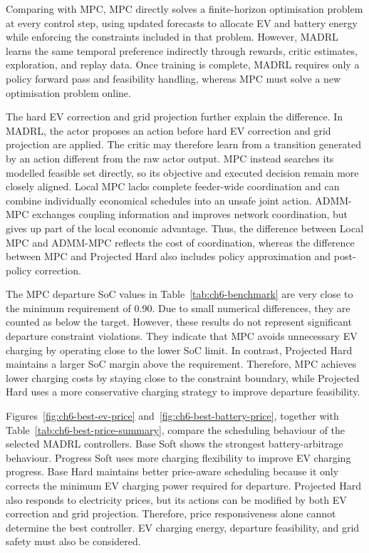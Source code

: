 Comparing with MPC, MPC directly solves a finite-horizon optimisation problem at every control step, using updated forecasts to allocate EV and battery energy while enforcing the constraints included in that problem. However, MADRL learns the same temporal preference indirectly through rewards, critic estimates, exploration, and replay data. Once training is complete, MADRL requires only a policy forward pass and feasibility handling, whereas MPC must solve a new optimisation problem online. 

The hard EV correction and grid projection further explain the difference. In MADRL, the actor proposes an action before hard EV correction and grid projection are applied. The critic may therefore learn from a transition generated by an action different from the raw actor output. MPC instead searches its modelled feasible set directly, so its objective and executed decision remain more closely aligned. Local MPC lacks complete feeder-wide coordination and can combine individually economical schedules into an unsafe joint action. ADMM-MPC exchanges coupling information and improves network coordination, but gives up part of the local economic advantage. Thus, the difference between Local MPC and ADMM-MPC reflects the cost of coordination, whereas the difference between MPC and Projected Hard also includes policy approximation and post-policy correction.

The MPC departure SoC values in Table~\ref{tab:ch6-benchmark} are very close to the minimum requirement of 0.90. Due to small numerical differences, they are counted as below the target. However, these results do not represent significant departure constraint violations. They indicate that MPC avoids unnecessary EV charging by operating close to the lower SoC limit. In contrast, Projected Hard maintains a larger SoC margin above the requirement. Therefore, MPC achieves lower charging costs by staying close to the constraint boundary, while Projected Hard uses a more conservative charging strategy to improve departure feasibility.

Figures~\ref{fig:ch6-best-ev-price} and~\ref{fig:ch6-best-battery-price}, together with Table~\ref{tab:ch6-best-price-summary}, compare the scheduling behaviour of the selected MADRL controllers. Base Soft shows the strongest battery-arbitrage behaviour. Progress Soft uses more charging flexibility to improve EV charging progress. Base Hard maintains better price-aware scheduling because it only corrects the minimum EV charging power required for departure. Projected Hard also responds to electricity prices, but its actions can be modified by both EV correction and grid projection. Therefore, price responsiveness alone cannot determine the best controller. EV charging energy, departure feasibility, and grid safety must also be considered.

